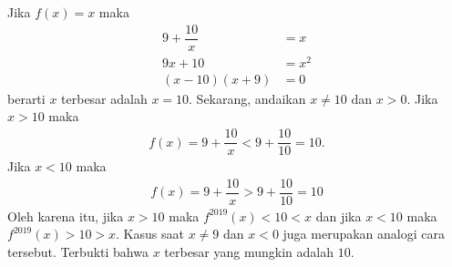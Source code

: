 
\begin{solusi}
Jika $f(x)=x$ maka 
\begin{align*}
    9+\dfrac{10}{x} &= x\\
    9x+10 &= x^2\\
    (x-10)(x+9) &= 0
\end{align*}
berarti $x$ terbesar adalah $x=10$. Sekarang, andaikan $x \neq 10$ dan $x > 0$. Jika $x>10$ maka
\begin{align*}	
f(x) = 9+\dfrac{10}{x} < 9 + \dfrac{10}{10} = 10.
\end{align*}
Jika $x<10$ maka
\begin{align*}
f(x) = 9+\dfrac{10}{x} > 9 + \dfrac{10}{10} = 10
\end{align*}
Oleh karena itu, jika $x>10$ maka $f^{2019}(x)<10<x$ dan jika $x<10$ maka $f^{2019}(x)>10>x$. Kasus saat $x \neq 9$ dan $x<0$ juga merupakan analogi cara tersebut.
Terbukti bahwa $x$ terbesar yang mungkin adalah $\boxed{10}$.
\end{solusi}